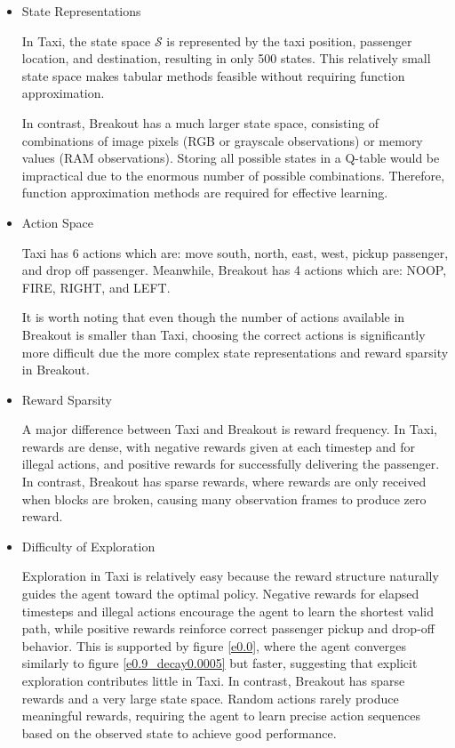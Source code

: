\documentclass[11pt]{article}
\begin{document}
\begin{itemize}
    \item State Representations
    
    In Taxi, the state space $\mathcal{S}$ is represented by the taxi position, passenger location, and destination, resulting in only 500 states. This relatively small state space makes tabular methods feasible without requiring function approximation.
    
    In contrast, Breakout has a much larger state space, consisting of combinations of image pixels (RGB or grayscale observations) or memory values (RAM observations). Storing all possible states in a Q-table would be impractical due to the enormous number of possible combinations. Therefore, function approximation methods are required for effective learning.

    \item Action Space
    
    Taxi has 6 actions which are: move south, north, east, west, pickup passenger, and drop off passenger. Meanwhile, Breakout has 4 actions which are: NOOP, FIRE, RIGHT, and LEFT.

    It is worth noting that even though the number of actions available in Breakout is smaller than Taxi, choosing the correct actions is significantly more difficult due the more complex state representations and reward sparsity in Breakout.

    \item Reward Sparsity
    
    A major difference between Taxi and Breakout is reward frequency. In Taxi, rewards are dense, with negative rewards given at each timestep and for illegal actions, and positive rewards for successfully delivering the passenger. In contrast, Breakout has sparse rewards, where rewards are only received when blocks are broken, causing many observation frames to produce zero reward.

    \item Difficulty of Exploration
    
    Exploration in Taxi is relatively easy because the reward structure naturally guides the agent toward the optimal policy. Negative rewards for elapsed timesteps and illegal actions encourage the agent to learn the shortest valid path, while positive rewards reinforce correct passenger pickup and drop-off behavior. This is supported by figure \ref{e0.0}, where the agent converges similarly to figure \ref{e0.9_decay0.0005} but faster, suggesting that explicit exploration contributes little in Taxi. In contrast, Breakout has sparse rewards and a very large state space. Random actions rarely produce meaningful rewards, requiring the agent to learn precise action sequences based on the observed state to achieve good performance.


\end{itemize}
\end{document}
